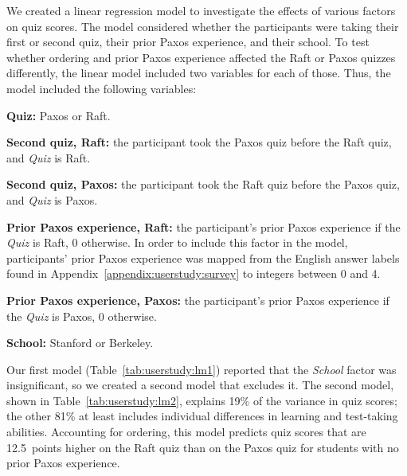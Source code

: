 We created a linear regression model to investigate the effects of various factors
on quiz scores. The model considered whether the participants were
taking their first or second quiz, their prior Paxos experience, and
their school. To test whether ordering and prior Paxos experience
affected the Raft or Paxos quizzes differently, the linear model
included two variables for each of those. Thus, the model included the
following variables:
\begin{compactitem}
\item \textbf{Quiz:} Paxos or Raft.
\item \textbf{Second quiz, Raft:} the participant took the Paxos quiz before
the Raft quiz, and \emph{Quiz} is Raft.
\item \textbf{Second quiz, Paxos:} the participant took the Raft quiz before
the Paxos quiz, and \emph{Quiz} is Paxos.
\item \textbf{Prior Paxos experience, Raft:}
the participant's prior Paxos experience if the \emph{Quiz} is Raft,
0 otherwise. In order to include this factor in the model,
participants' prior Paxos experience was mapped from the
English answer labels found in Appendix~\ref{appendix:userstudy:survey}
to integers between 0 and 4.
\item \textbf{Prior Paxos experience, Paxos:}
the participant's prior Paxos experience if the \emph{Quiz} is Paxos,
0 otherwise.
\item \textbf{School:} Stanford or Berkeley.
\end{compactitem}

Our first model (Table~\ref{tab:userstudy:lm1}) reported that the \emph{School}
factor was insignificant, so we created a second model that excludes it.
The second model, shown in Table~\ref{tab:userstudy:lm2}, explains
19\% of the
variance in quiz scores; the other 81\% at least includes individual
differences in learning and test-taking abilities. Accounting for
ordering, this model predicts quiz scores
that are \SI{12.5}{points} higher on the Raft quiz than on the Paxos quiz for
students with no prior Paxos experience.

